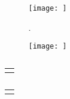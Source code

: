 \begin{figure}[ht]
	\centering
	\texttt{[image: ]}
	\caption{\cite{}.}
	\label{}
\end{figure}\no
\begin{figure}[ht]
	\centering
	\subbottom[]{\texttt{[image: ]}\label{}}
	\hfill
	\subbottom[]{\texttt{[image: ]}\label{}}
	\caption{}
	\label{}
\end{figure}\no
\begin{wrapfigure}{l}{8cm}
	\vspace*{-10pt}
	\texttt{[image: ]}
	\caption{}
	\label{}
	\vspace*{-5pt}
\end{wrapfigure} 
\begin{table}[ht]
	\begin{tabularx}{\textwidth}{|}
		
	\end{tabularx}
	\caption{}
	\label{}
\end{table}
\cline{}
\begin{table}[ht]
	\centering
	\begin{tabular}{|}
		
	\end{tabular}
	\caption{}
	\label{}
\end{table}